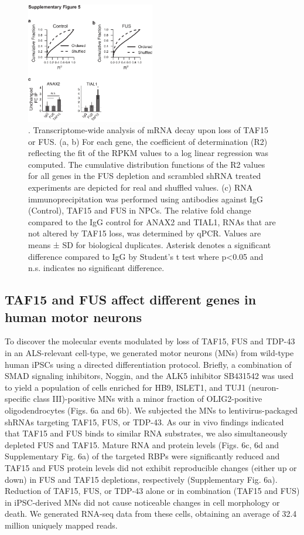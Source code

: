 \begin{figure}[ht]
  \centering
  \includegraphics[width=0.5\textwidth]{chapter_2_figures/Figure_S5}
  \caption[Supplementary Figure 5]{. Transcriptome-wide analysis of mRNA decay upon loss of TAF15 or FUS. (a, b) For each gene, the coefficient of determination (R2) reflecting the fit of the RPKM values to a log linear regression was computed. The cumulative distribution functions of the R2 values for all genes in the FUS depletion and scrambled shRNA treated experiments are depicted for real and shuffled values. (c) RNA immunoprecipitation was performed using antibodies against IgG (Control), TAF15 and FUS in NPCs. The relative fold change compared to the IgG control for ANAX2 and TIAL1, RNAs that are not altered by TAF15 loss, was determined by qPCR. Values are means ± SD for biological duplicates. Asterisk denotes a significant difference compared to IgG by Student’s t test where p<0.05 and n.s. indicates no significant difference. }
  \label{fig:Figure_S5}
\end{figure}

\subsection{TAF15 and FUS affect different genes in human motor neurons}
To discover the molecular events modulated by loss of TAF15, FUS and TDP-43 in an ALS-relevant cell-type, we generated motor neurons (MNs) from wild-type human iPSCs using a directed differentiation protocol\cite{Chambers2009}. Briefly, a combination of SMAD signaling inhibitors, Noggin, and the ALK5 inhibitor SB431542 was used to yield a population of cells enriched for HB9, ISLET1, and TUJ1 (neuron-specific class III)-positive MNs with a minor fraction of OLIG2-positive oligodendrocytes (Figs. 6a and 6b). We subjected the MNs to lentivirus-packaged shRNAs targeting TAF15, FUS, or TDP-43. As our in vivo findings indicated that TAF15 and FUS binds to similar RNA substrates, we also simultaneously depleted FUS and TAF15. Mature RNA and protein levels (Figs. 6c, 6d and Supplementary Fig. 6a) of the targeted RBPs were significantly reduced and TAF15 and FUS protein levels did not exhibit reproducible changes (either up or down) in FUS and TAF15 depletions, respectively (Supplementary Fig. 6a). Reduction of TAF15, FUS, or TDP-43 alone or in combination (TAF15 and FUS) in iPSC-derived MNs did not cause noticeable changes in cell morphology or death. We generated RNA-seq data from these cells, obtaining an average of 32.4 million uniquely mapped reads.


